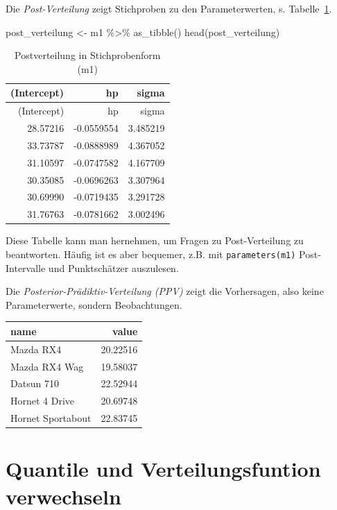 \documentclass[
  a4paper,
  DIV=11]{scrreprt}
\newenvironment{Shaded}{\begin{snugshade}}{\end{snugshade}}
\newcommand{\FunctionTok}[1]{\textcolor[rgb]{0.28,0.35,0.67}{#1}}
\newcommand{\NormalTok}[1]{\textcolor[rgb]{0.00,0.23,0.31}{#1}}
\newcommand{\OtherTok}[1]{\textcolor[rgb]{0.00,0.23,0.31}{#1}}
\newcommand{\SpecialCharTok}[1]{\textcolor[rgb]{0.37,0.37,0.37}{#1}}
\theoremstyle{definition}
\theoremstyle{remark}
\begin{document}
Die \emph{Post-Verteilung} zeigt Stichproben zu den Parameterwerten, s.
Tabelle~\ref{tbl-post-m1}.

\begin{Shaded}
\begin{Highlighting}[]
\NormalTok{post\_verteilung }\OtherTok{\textless{}{-}}\NormalTok{ m1 }\SpecialCharTok{\%\textgreater{}\%} 
  \FunctionTok{as\_tibble}\NormalTok{()}
\FunctionTok{head}\NormalTok{(post\_verteilung)}
\end{Highlighting}
\end{Shaded}

\hypertarget{tbl-post-m1}{}
\begin{longtable}[]{@{}rrr@{}}
\caption{\label{tbl-post-m1}Postverteilung in Stichprobenform
(m1)}\tabularnewline
\toprule()
(Intercept) & hp & sigma \\
\midrule()
\endfirsthead
\toprule()
(Intercept) & hp & sigma \\
\midrule()
\endhead
28.57216 & -0.0559554 & 3.485219 \\
33.73787 & -0.0888989 & 4.367052 \\
31.10597 & -0.0747582 & 4.167709 \\
30.35085 & -0.0696263 & 3.307964 \\
30.69990 & -0.0719435 & 3.291728 \\
31.76763 & -0.0781662 & 3.002496 \\
\bottomrule()
\end{longtable}

Diese Tabelle kann man hernehmen, um Fragen zu Post-Verteilung zu
beantworten. Häufig ist es aber bequemer, z.B. mit
\texttt{parameters(m1)} Post-Intervalle und Punktschätzer auszulesen.

Die \emph{Posterior-Prädiktiv-Verteilung (PPV)} zeigt die Vorhersagen,
also keine Parameterwerte, sondern Beobachtungen.

\begin{longtable}[]{@{}lr@{}}
\toprule()
name & value \\
\midrule()
\endhead
Mazda RX4 & 20.22516 \\
Mazda RX4 Wag & 19.58037 \\
Datsun 710 & 22.52944 \\
Hornet 4 Drive & 20.69748 \\
Hornet Sportabout & 22.83745 \\
\bottomrule()
\end{longtable}

\hypertarget{quantile-und-verteilungsfuntion-verwechseln}{%
\section{Quantile und Verteilungsfuntion verwechseln
🤷}\label{quantile-und-verteilungsfuntion-verwechseln}}
\end{document}
